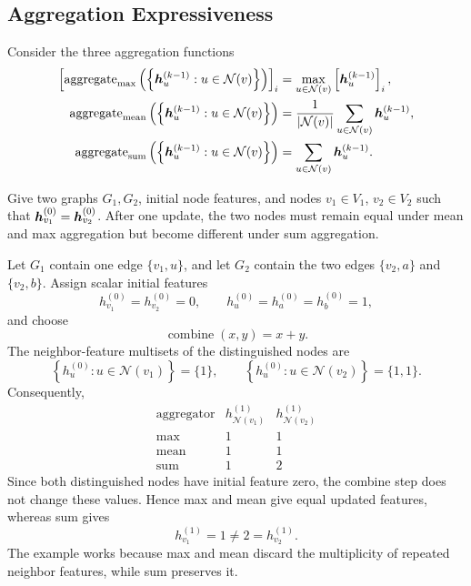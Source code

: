 \subsection{Aggregation Expressiveness}

Consider the three aggregation functions
\begin{align*}
  \left[
  \operatorname{aggregate}_{\max}
  \left(\left\{\bm{h}_u^{(k-1)}:u\in\mathcal N(v)\right\}\right)
  \right]_i
  &=\max_{u\in\mathcal N(v)}
    \left[\bm{h}_u^{(k-1)}\right]_i,\\
  \operatorname{aggregate}_{\mathrm{mean}}
  \left(\left\{\bm{h}_u^{(k-1)}:u\in\mathcal N(v)\right\}\right)
  &=\frac{1}{|\mathcal N(v)|}
    \sum_{u\in\mathcal N(v)}\bm{h}_u^{(k-1)},\\
  \operatorname{aggregate}_{\mathrm{sum}}
  \left(\left\{\bm{h}_u^{(k-1)}:u\in\mathcal N(v)\right\}\right)
  &=\sum_{u\in\mathcal N(v)}\bm{h}_u^{(k-1)}.
\end{align*}

Give two graphs \(G_1,G_2\), initial node features, and nodes
\(v_1\in V_1\), \(v_2\in V_2\) such that
\(\bm{h}_{v_1}^{(0)}=\bm{h}_{v_2}^{(0)}\). After one update, the two
nodes must remain equal under mean and max aggregation but become different
under sum aggregation.

\begin{solution}
Let \(G_1\) contain one edge \(\{v_1,u\}\), and let \(G_2\) contain the two
edges \(\{v_2,a\}\) and \(\{v_2,b\}\).  Assign scalar initial features
\[
  h_{v_1}^{(0)}=h_{v_2}^{(0)}=0,
  \qquad
  h_u^{(0)}=h_a^{(0)}=h_b^{(0)}=1,
\]
and choose
\[
  \operatorname{combine}(x,y)=x+y.
\]
The neighbor-feature multisets of the distinguished nodes are
\[
  \left\{h_u^{(0)}:u\in\mathcal N(v_1)\right\}=\{1\},
  \qquad
  \left\{h_u^{(0)}:u\in\mathcal N(v_2)\right\}=\{1,1\}.
\]
Consequently,
\[
\begin{array}{c|cc}
  \text{aggregator}
    & h_{\mathcal N(v_1)}^{(1)}
    & h_{\mathcal N(v_2)}^{(1)}\\ \hline
  \max  & 1&1\\
  \mathrm{mean}&1&1\\
  \mathrm{sum}&1&2
\end{array}
\]
Since both distinguished nodes have initial feature zero, the combine step
does not change these values.  Hence max and mean give equal updated features,
whereas sum gives
\[
  h_{v_1}^{(1)}=1\ne 2=h_{v_2}^{(1)}.
\]
The example works because max and mean discard the multiplicity of repeated
neighbor features, while sum preserves it.
\end{solution}

